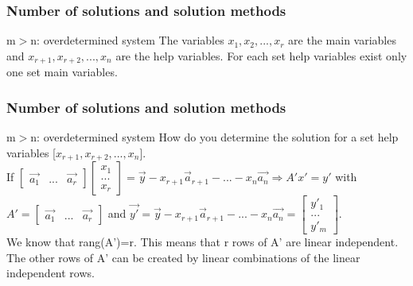\begin{frame}
	\frametitle{Number of solutions and solution methods}
	\begin{block}{m$>$n: overdetermined system}
		\vspace{4mm}
		The variables $x_1,x_2,...,x_r$ are the main variables and $x_{r+1},x_{r+2},...,x_n$ are the help variables. For each set help variables exist only one set main variables.\vspace{4mm}
	\end{block}
\end{frame}

\begin{frame}
	\frametitle{Number of solutions and solution methods}
	\begin{block}{m$>$n: overdetermined system}
		How do you determine the solution for a set help variables [$x_{r+1},x_{r+2},...,x_n$].\\
		If $\begin{bmatrix} \overrightarrow{a_1} & ... & \overrightarrow{a_r} \end{bmatrix} \begin{bmatrix}
		x_1\\...\\x_r \end{bmatrix}=\overrightarrow{y}-x_{r+1}\overrightarrow{a}_{r+1}-...-x_n\overrightarrow{a_n}
		\Rightarrow A'x'=y'$ with $A'=\begin{bmatrix} \overrightarrow{a_1} & ... & \overrightarrow{a_r} \end{bmatrix}$ and $\overrightarrow{y'}=\overrightarrow{y}-x_{r+1}\overrightarrow{a}_{r+1}-...-x_n\overrightarrow{a_n}=\begin{bmatrix}
		y'_1\\...\\y'_m
		\end{bmatrix}$.\\
		We know that rang(A')=r. This means that r rows of A' are linear independent. The other rows of A' can be created by linear combinations of the linear independent rows. 
	\end{block}
\end{frame}

